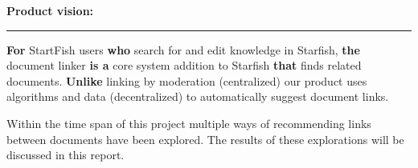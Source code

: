 \begin{shaded}
\textbf{{\large Product vision:}} \vspace{0.4\baselineskip} \hrule 
\vspace{1em}
{\large
\begin{spacing}{1.5}
	{\bf For} StartFish users {\bf who} search for and edit knowledge in Starfish,
	{\bf the} document linker {\bf is a} core system addition to Starfish
	{\bf that} finds related documents. {\bf Unlike} linking by moderation (centralized) our product uses algorithms and data (decentralized) to automatically suggest document links.
\end{spacing}
}
\end{shaded}


Within the time span of this project multiple ways of recommending links between documents have been explored. The results of these explorations will be discussed in this report. 
